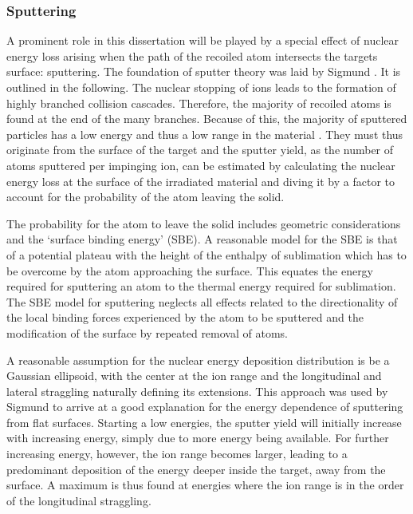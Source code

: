 \subsubsection{Sputtering}

A prominent role in this dissertation will be played by a special effect of nuclear energy loss arising when the path of the recoiled atom intersects the targets surface: sputtering. The foundation of sputter theory was laid by Sigmund \cite{sigmund_theory_1969}. It is outlined in the following. The nuclear stopping of ions leads to the formation of highly branched collision cascades. Therefore, the majority of recoiled atoms is found at the end of the many branches. Because of this, the majority of sputtered particles has a low energy and thus a low range in the material \cite{thompson_energy_1968}. They must thus originate from the surface of the target and the sputter yield, as the number of atoms sputtered per impinging ion, can be estimated by calculating the nuclear energy loss at the surface of the irradiated material and diving it by a factor to account for the probability of the atom leaving the solid. 

The probability for the atom to leave the solid includes geometric considerations and the `surface binding energy' (SBE). A reasonable model for the SBE is that of a potential plateau with the height of the enthalpy of sublimation which has to be overcome by the atom approaching the surface. This equates the energy required for sputtering an atom to the thermal energy required for sublimation. The SBE model for sputtering neglects all effects related to the directionality of the local binding forces experienced by the atom to be sputtered and the modification of the surface by repeated removal of atoms.

A reasonable assumption for the nuclear energy deposition distribution is be a Gaussian ellipsoid, with the center at the ion range and the longitudinal and lateral straggling naturally defining its extensions. This approach was used by Sigmund to arrive at a good explanation for the energy dependence of sputtering from flat surfaces. Starting a low energies, the sputter yield will initially increase with increasing energy, simply due to more energy being available. For further increasing energy, however, the ion range becomes larger, leading to a predominant deposition of the energy deeper inside the target, away from the surface. A maximum is thus found at energies where the ion range is in the order of the longitudinal straggling.

